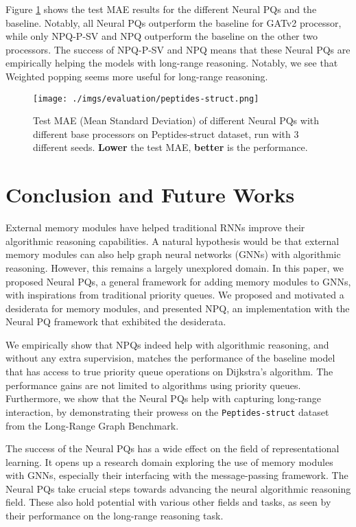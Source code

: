 \documentclass{article}
\theoremstyle{plain}
\theoremstyle{definition}
\theoremstyle{remark}
\begin{document}
Figure \ref{fig:eval-peptides-struct} shows the test MAE results for the different Neural PQs and the baseline.
Notably, all Neural PQs outperform the baseline for GATv2 processor, while only NPQ-P-SV and
NPQ outperform the baseline on the other two processors. The success of NPQ-P-SV and NPQ
means that these Neural PQs are empirically helping the models with long-range reasoning. Notably, we see that Weighted popping seems more useful for long-range reasoning.

\begin{figure}[tbh]
    \centering
    \texttt{[image: ./imgs/evaluation/peptides-struct.png]}
    \caption{Test MAE (Mean  Standard Deviation) of different Neural PQs with different base
             processors on Peptides-struct dataset, run with 3 different seeds. \textbf{Lower} the test MAE, \textbf{better} is the performance.}
    \label{fig:eval-peptides-struct}
\end{figure}

\section{Conclusion and Future Works}
External memory modules have helped traditional RNNs improve their algorithmic reasoning capabilities.
A natural hypothesis would be that external memory modules can also help graph neural networks (GNNs) with algorithmic reasoning.
However, this remains a largely unexplored domain.
In this paper, we proposed Neural PQs, a general framework for adding memory modules to GNNs, with inspirations from traditional priority queues.
We proposed and motivated a desiderata for memory modules, and presented NPQ, an implementation with the Neural PQ framework that exhibited the desiderata.

We empirically show that NPQs indeed help with algorithmic reasoning, and without any extra supervision, matches the performance of the baseline
model that has access to true priority queue operations on Dijkstra's algorithm. The performance gains are not limited to algorithms using priority queues.
Furthermore, we show that the Neural PQs help with capturing long-range interaction, by demonstrating their prowess on the \verb|Peptides-struct| dataset
from the Long-Range Graph Benchmark.

The success of the Neural PQs has a wide effect on the field of representational learning. It opens up a research domain exploring the use of memory modules
with GNNs, especially their interfacing with the message-passing framework. The Neural PQs take crucial steps towards advancing the neural algorithmic
reasoning field. These also hold potential with various other fields and tasks, as seen by their performance on the long-range reasoning task.
\end{document}
